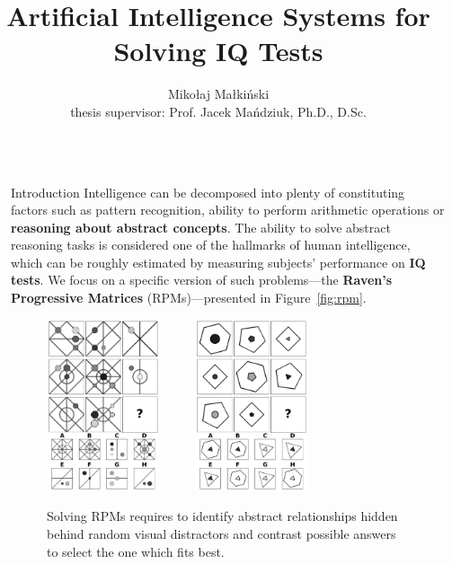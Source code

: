 \documentclass[final]{beamer}
\title{Artificial Intelligence Systems for Solving IQ Tests}
\author{Mikołaj Małkiński \\ thesis supervisor: Prof. Jacek Mańdziuk, Ph.D., D.Sc.}
\institute[shortinst]{Warsaw University of Technology, Faculty of Mathematics and Information Science}
\newlength{\sepwidth}
\newlength{\colwidth}
\newcommand{\separatorcolumn}{\begin{column}{\sepwidth}\end{column}}
\begin{document}
    \begin{frame}[t]
        \begin{columns}[t]
            \separatorcolumn

            \begin{column}{\colwidth}

                \begin{block}{Introduction}
                    Intelligence can be decomposed into plenty of constituting factors such as pattern recognition, ability to perform arithmetic operations or \textbf{reasoning about abstract concepts}.
                    The ability to solve abstract reasoning tasks is considered one of the hallmarks of human intelligence, which can be roughly estimated by measuring subjects' performance on \textbf{IQ tests}.
                    We focus on a specific version of such problems---the \textbf{Raven's Progressive Matrices} (RPMs)---presented in Figure~\ref{fig:rpm}.
                    \begin{figure}
                        \centering
                        \includegraphics[width=0.31\textwidth]{pgm_rpm_0}
                        ~
                        ~
                        ~
                        \includegraphics[width=0.31\textwidth]{raven_rpm_0}
                        \caption{
                        Solving RPMs requires to identify abstract relationships hidden behind random visual distractors and contrast possible answers to select the one which fits best.
}
\end{figure}
\end{block}
\end{column}
\end{columns}
\end{frame}
\end{document}
